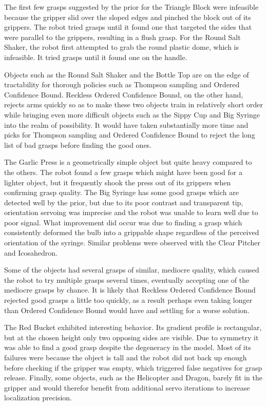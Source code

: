 \documentclass{article}
\newcommand{\algorithmCTxt}{Ordered Confidence Bound\xspace}
\newcommand{\algorithmDTxt}{Reckless Ordered Confidence Bound\xspace}
\begin{document}
The first few grasps suggested by the prior for the Triangle Block were infeasible because
the gripper slid over the sloped edges and pinched the block out of its grippers. The robot
tried grasps until it found one that targeted the sides that were parallel to the grippers,
resulting in a flush grasp. 
For the Round Salt Shaker, the robot first attempted to grab the round plastic dome, which 
is infeasible. It tried grasps until it found one on the handle.

Objects such as the Round Salt Shaker and the Bottle Top are on the edge of tractability
for thorough policies such as Thompson sampling and \algorithmCTxt. \algorithmDTxt, on the other
hand, rejects arms quickly so as to make these two objects train in relatively short order
while bringing even more difficult objects such as the Sippy Cup and Big Syringe into the
realm of possibility. It would have taken substantially more time and picks for Thompson
sampling and \algorithmCTxt to reject the long list of bad grasps before finding the good ones.

The Garlic Press is a geometrically simple object but quite heavy compared to the others. The
robot found a few grasps which might have been good for a lighter object, but it frequently
shook the press out of its grippers when confirming grasp quality.
The Big Syringe has some good grasps which are detected well by the prior, but due to its poor
contrast and transparent tip, orientation servoing was imprecise and the robot was unable to
learn well due to poor signal. What improvement did occur was due to finding a grasp which
consistently deformed the bulb into a grippable shape regardless of the perceived orientation
of the syringe. Similar problems were observed with the Clear Pitcher and Icosahedron.

Some of the objects had several grasps of similar, mediocre quality, which
caused the robot to try multiple grasps several times, eventually accepting one of the
mediocre grasps by chance. It is likely that \algorithmDTxt rejected good grasps a little
too quickly, as a result perhaps even taking longer than \algorithmCTxt would have and settling
for a worse solution.

The Red Bucket exhibited interesting behavior. Its gradient profile is rectangular, but at the
chosen height only two opposing sides are visible. Due to symmetry it was able to find a good
grasp despite the degeneracy in the model. Most of its failures were because the object is tall
and the robot did not back up enough before checking if the gripper was empty, which triggered
false negatives for grasp release.
Finally, some objects, such as the Helicopter and Dragon, barely fit in the gripper and would
therefor benefit from additional servo iterations to increase localization precision. 
\end{document}
